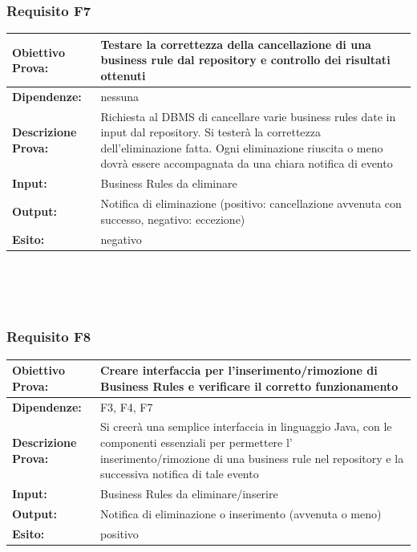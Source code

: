 \documentclass[11pt,titlepage,a4paper]{report}
\begin{document}
\subsubsection{Requisito F7}
\begin{tabular}{||p{4.5cm}||p{7.5cm}||}
\hline
{\textbf {Obiettivo Prova:}}& Testare la correttezza della cancellazione di una business rule dal repository e controllo dei risultati ottenuti\\ \hline
{\textbf{Dipendenze:}}& nessuna \\ \hline
{\textbf{Descrizione Prova:}}&  Richiesta al DBMS di cancellare varie business rules date in input dal repository. Si tester\`a la correttezza dell'eliminazione fatta. Ogni eliminazione riuscita o meno dovr\`a essere accompagnata da una chiara notifica di evento\\ \hline
{\textbf{Input:}}& Business Rules da eliminare \\ \hline
{\textbf{Output:}}& Notifica di eliminazione (positivo: cancellazione avvenuta con successo, negativo: eccezione) \\ \hline
{\textbf{Esito:}}& negativo \\ \hline
\end{tabular} \\
\\
\\
\subsubsection{Requisito F8}
\begin{tabular}{||p{4.5cm}||p{7.5cm}||}
\hline
{\textbf {Obiettivo Prova:}}& Creare interfaccia per l'inserimento/rimozione di Business Rules e verificare il corretto funzionamento\\ \hline
{\textbf{Dipendenze:}}& F3, F4, F7 \\ \hline
{\textbf{Descrizione Prova:}}& Si creer\`a  una semplice interfaccia in linguaggio Java, con le componenti essenziali per permettere l' inserimento/rimozione di una business rule nel repository e la successiva notifica di tale evento \\ \hline
{\textbf{Input:}}& Business Rules da eliminare/inserire \\ \hline
{\textbf{Output:}}& Notifica di eliminazione o inserimento (avvenuta o meno) \\ \hline
{\textbf{Esito:}}& positivo\\ \hline
\end{tabular} \\
\\
\\
\end{document}
